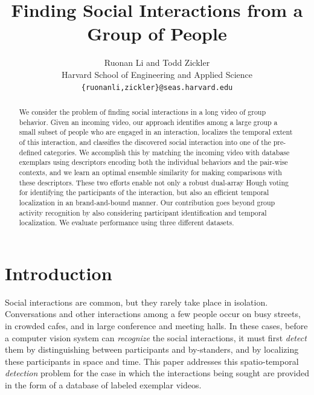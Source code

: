\documentclass[10pt,twocolumn,letterpaper]{article}
\begin{document}
\title{Finding Social Interactions from a Group of People}
\author{ Ruonan Li and Todd Zickler\\
Harvard School of Engineering and Applied Science\\
{\tt\small \{ruonanli,zickler\}@seas.harvard.edu}
}

\maketitle

\begin{abstract}
We consider the problem of finding social interactions in a long video of group behavior. Given an incoming video, our approach identifies among a large group a small subset of people who are engaged in an interaction, localizes the temporal extent of this interaction, and classifies the discovered social interaction into one of the pre-defined categories. We accomplish this by matching the incoming video with database exemplars using descriptors encoding both the individual behaviors and the pair-wise contexts, and we learn an optimal ensemble similarity for making comparisons with these descriptors. These two efforts enable not only a robust dual-array Hough voting for identifying the participants of the interaction, but also an efficient temporal localization in an brand-and-bound manner. Our contribution goes beyond group activity recognition by also considering participant identification and temporal localization. We evaluate performance using three different datasets.
\end{abstract}

\section{Introduction}

Social interactions are common, but they rarely take place in isolation. Conversations and other interactions among a few people occur on busy streets, in crowded cafes, and in large conference and meeting halls. In these cases, before a computer vision system can \emph{recognize} the social interactions, it must first \emph{detect} them by distinguishing between participants and by-standers, and by localizing these participants in space and time. This paper addresses this spatio-temporal \emph{detection} problem for the case in which the interactions being sought are provided in the form of a database of labeled exemplar videos.
\end{document}
